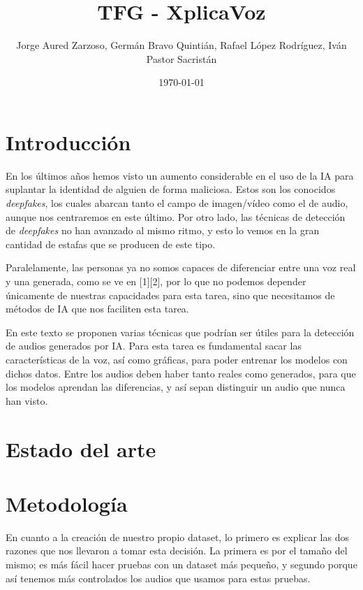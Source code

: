 \documentclass{article}
\title{TFG - XplicaVoz}
\author{\parbox{.7\textwidth}{\centering Jorge Aured Zarzoso, Germán Bravo Quintián, Rafael López Rodríguez, Iván Pastor Sacristán}}
\date{\today}
\begin{document}
\maketitle

\section{Introducción}
En los últimos años hemos visto un aumento considerable en el uso de la IA para suplantar la identidad de alguien de forma maliciosa. Estos son los conocidos \emph{deepfakes}, los cuales abarcan tanto el campo de imagen/vídeo como el de audio, aunque nos centraremos en este último. Por otro lado, las técnicas de detección de \emph{deepfakes} no han avanzado al mismo ritmo, y esto lo vemos en la gran cantidad de estafas que se producen de este tipo.

	Paralelamente, las personas ya no somos capaces de diferenciar entre una voz real y una generada, como se ve en [1][2], por lo que no podemos depender únicamente de nuestras capacidades para esta tarea, sino que necesitamos de métodos de IA que nos faciliten esta tarea.
	
	En este texto se proponen varias técnicas que podrían ser útiles para la detección de audios generados por IA. Para esta tarea es fundamental sacar las características de la voz, así como gráficas, para poder entrenar los modelos con dichos datos. Entre los audios deben haber tanto reales como generados, para que los modelos aprendan las diferencias, y así sepan distinguir un audio que nunca han visto.

\section{Estado del arte}



\section{Metodología}

En cuanto a la creación de nuestro propio dataset, lo primero es explicar las dos razones que nos llevaron a tomar esta decisión. La primera es por el tamaño del mismo; es más fácil hacer pruebas con un dataset más pequeño, y segundo porque así tenemos más controlados los audios que usamos para estas pruebas.
\end{document}
